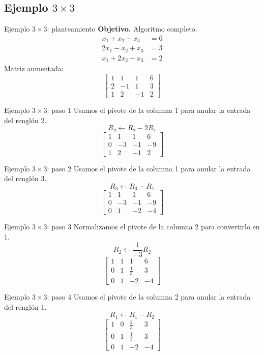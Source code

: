 \documentclass[aspectratio=169,9pt]{beamer}
\theoremstyle{remark}
\begin{document}
\subsection{Ejemplo $3\times3$}
\begin{frame}[t]{Ejemplo $3\times3$: planteamiento}
\textbf{Objetivo.} Algoritmo completo.
\[
\begin{aligned}
x_{1} + x_{2} + x_{3} &= 6\\
2 x_{1} - x_{2} + x_{3} &= 3\\
x_{1} + 2 x_{2} - x_{3} &= 2
\end{aligned}
\]
Matriz aumentada:
\[
\left[\begin{array}{ccc|c}
1 & 1 & 1 & 6\\
2 & -1 & 1 & 3\\
1 & 2 & -1 & 2
\end{array}\right]
\]
\end{frame}
\begin{frame}[t]{Ejemplo $3\times3$: paso 1}
Usamos el pivote de la columna 1 para anular la entrada del renglón 2.
\[
R_{2}\leftarrow R_{2}-2R_{1}
\]
\[
\left[\begin{array}{ccc|c}
1 & 1 & 1 & 6\\
0 & -3 & -1 & -9\\
1 & 2 & -1 & 2
\end{array}\right]
\]
\end{frame}
\begin{frame}[t]{Ejemplo $3\times3$: paso 2}
Usamos el pivote de la columna 1 para anular la entrada del renglón 3.
\[
R_{3}\leftarrow R_{3}-R_{1}
\]
\[
\left[\begin{array}{ccc|c}
1 & 1 & 1 & 6\\
0 & -3 & -1 & -9\\
0 & 1 & -2 & -4
\end{array}\right]
\]
\end{frame}
\begin{frame}[t]{Ejemplo $3\times3$: paso 3}
Normalizamos el pivote de la columna 2 para convertirlo en 1.
\[
R_{2}\leftarrow \frac{1}{-3}R_{2}
\]
\[
\left[\begin{array}{ccc|c}
1 & 1 & 1 & 6\\
0 & 1 & \frac{1}{3} & 3\\
0 & 1 & -2 & -4
\end{array}\right]
\]
\end{frame}
\begin{frame}[t]{Ejemplo $3\times3$: paso 4}
Usamos el pivote de la columna 2 para anular la entrada del renglón 1.
\[
R_{1}\leftarrow R_{1}-R_{2}
\]
\[
\left[\begin{array}{ccc|c}
1 & 0 & \frac{2}{3} & 3\\
0 & 1 & \frac{1}{3} & 3\\
0 & 1 & -2 & -4
\end{array}\right]
\]
\end{frame}
\end{document}
